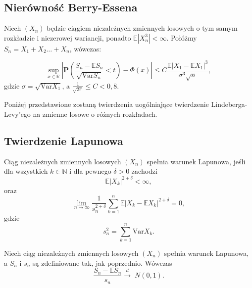 \subsection*{Nierówność Berry-Essena}
\begin{tw}
	Niech $(X_n)$ będzie ciągiem niezależnych zmiennych losowych o tym samym rozkładzie i niezerowej wariancji, ponadto $\mathbb{E}|X_n^3| < \infty$. Połóżmy $S_n = X_1 + X_2 \ldots + X_n$, wówczas:

	\begin{equation}
		\sup_{x \in \mathbb{R}} 
		\left| 			
			\textbf{P} 
			\left(  
				\frac{S_n-\mathbb{E}S_n}{\sqrt{\text{Var}S_n}} < t 
			\right) 
			- 
			\Phi(x)
		 \right| \leq
			C \frac{\mathbb{E}|X_1 - \mathbb{E}X_1|^3}{ \sigma^3 \sqrt{n}}, 
	\end{equation}	
	gdzie $\sigma= \sqrt{\text{Var}X_1}$, a $\frac{1}{\sqrt{2\pi}} \le C  < 0,8$.
\end{tw}

Poniżej przedstawione zostaną twierdzenia uogólniające twierdzenie Lindeberga-Levy'ego na zmienne losowe o różnych rozkładach.

\subsection{Twierdzenie Lapunowa}
	\begin{df}
		Ciąg niezależnych zmiennych losowych $(X_n)$ spełnia warunek Lapunowa, jeśli dla wszystkich $k \in \mathbb{N}$ i dla pewnego $\delta > 0$ zachodzi 
		$$
		\mathbb{E}|X_k|^{2 + \delta} < \infty,
		$$
		oraz 
		\begin{equation*}
			\lim\limits_{n \to \infty} \frac{1}{s_n^{2+\delta}} 
				\sum_{k=1}^{n} \mathbb{E}|X_k - \mathbb{E}X_k|^{2 +\delta}= 0,
		\end{equation*}
		gdzie 
		\begin{equation*}
			s_n^2 =  \sum_{k=1}^{n} \text{Var}X_k.
		\end{equation*}
	\end{df}
	
	\begin{tw}
		Niech ciąg niezależnych zmiennych losowych $(X_n)$ spełnia warunek Lapunowa, a $S_n$ i $s_n$ są zdefiniowane tak, jak poprzednio. Wówczas
		\begin{equation*}
			\frac{S_n -\mathbb{E}S_n}{s_n} \stackrel{d}{\to} \; N(0,1).
		\end{equation*}
	\end{tw}
